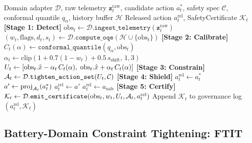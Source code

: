 \begin{algorithm}[h]
\caption{DC3S Universal Kernel: \texttt{execute\_universal\_step}}\label{alg:dc3s}
\begin{algorithmic}[1]
\Require Domain adapter $\mathcal{D}$, raw telemetry $\mathbf{z}_t^{\mathrm{raw}}$,
         candidate action $a_t^*$, safety spec $\mathcal{C}$,
         conformal quantile $q_\alpha$, history buffer $\mathcal{H}$
\Ensure  Released action $a_t^{\mathrm{rel}}$, SafetyCertificate $\mathcal{K}_t$
\Statex
\State \textbf{[Stage 1: Detect]}
\State $\mathrm{obs}_t \gets \mathcal{D}.\texttt{ingest\_telemetry}(\mathbf{z}_t^{\mathrm{raw}})$
\State $(w_t, \mathrm{flags}, d_t, s_t) \gets \mathcal{D}.\texttt{compute\_oqe}(\mathcal{H} \cup \{\mathrm{obs}_t\})$
\Statex
\State \textbf{[Stage 2: Calibrate]}
\State $C_t(\alpha) \gets \texttt{conformal\_quantile}(q_\alpha, \mathrm{obs}_t)$
\State $\alpha_t \gets \mathrm{clip}(1 + 0.7(1-w_t) + 0.5\,s_{\mathrm{shift}},\, 1, 3)$
\State $U_t \gets [\mathrm{obs}_t.\hat{x} - \alpha_t\,C_t(\alpha),\; \mathrm{obs}_t.\hat{x} + \alpha_t\,C_t(\alpha)]$
\Statex
\State \textbf{[Stage 3: Constrain]}
\State $\mathcal{A}_t \gets \mathcal{D}.\texttt{tighten\_action\_set}(U_t, \mathcal{C})$
\Statex
\State \textbf{[Stage 4: Shield]}
  \State $a_t^{\mathrm{rel}} \gets a_t^*$ 
\Else
  \State $a' \gets \mathrm{proj}_{\mathcal{A}_t}(a_t^*)$ 
    \State $a_t^{\mathrm{rel}} \gets a'$
  \Else
    \State $a_t^{\mathrm{rel}} \gets a_{\mathrm{safe}}$ 
  \EndIf
\EndIf
\Statex
\State \textbf{[Stage 5: Certify]}
\State $\mathcal{K}_t \gets \mathcal{D}.\texttt{emit\_certificate}(\mathrm{obs}_t, w_t, U_t, \mathcal{A}_t, a_t^{\mathrm{rel}})$
\State Append $\mathcal{K}_t$ to governance log
\State \Return $(a_t^{\mathrm{rel}}, \mathcal{K}_t)$
\end{algorithmic}
\end{algorithm}

\subsection{Battery-Domain Constraint Tightening: FTIT}

